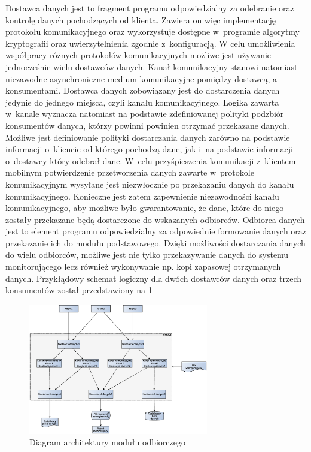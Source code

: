 Dostawca danych jest to fragment programu odpowiedzialny za odebranie
oraz kontrolę danych pochodzących od klienta. Zawiera on więc
implementację protokołu komunikacyjnego oraz wykorzystuje dostępne
w~programie algorytmy kryptografii oraz uwierzytelnienia zgodnie
z~konfiguracją. W celu umożliwienia współpracy różnych protokołów
komunikacyjnych możliwe jest używanie jednocześnie wielu dostawców
danych. Kanał komunikacyjny stanowi natomiast niezawodne
asynchroniczne medium komunikacyjne pomiędzy dostawcą, a
konsumentami. Dostawca danych zobowiązany jest do dostarczenia danych
jedynie do jednego miejsca, czyli kanału komunikacyjnego. Logika
zawarta w~kanale wyznacza natomiast na podstawie zdefiniowanej
polityki podzbiór konsumentów danych, którzy powinni powinien otrzymać
przekazane danych. Możliwe jest definiowanie polityki dostarczania
danych zarówno na podstawie informacji o~kliencie od którego pochodzą
dane, jak i~na podstawie informacji o~dostawcy który odebrał
dane. W~celu przyśpieszenia komunikacji z~klientem mobilnym
potwierdzenie przetworzenia danych zawarte w~protokole komunikacyjnym
wysyłane jest niezwłocznie po przekazaniu danych do kanału
komunikacyjnego. Konieczne jest zatem zapewnienie niezawodności kanału
komunikacyjnego, aby możliwe było gwarantowanie, że dane, które do
niego zostały przekazane będą dostarczone do wskazanych
odbiorców. Odbiorca danych jest to element programu odpowiedzialny za
odpowiednie formowanie danych oraz przekazanie ich do modułu
podstawowego. Dzięki możliwości dostarczania danych do wielu
odbiorców, możliwe jest nie tylko przekazywanie danych do systemu
monitorującego lecz również wykonywanie np. kopi zapasowej otrzymanych
danych. Przykłądowy schemat logiczny dla dwóch dostawców danych oraz
trzech konsumentów został przedstawiony na \ref{fig:odbiorczy}

\begin{figure}[ht]
  \caption{Diagram architektury modułu odbiorczego}
  \label{fig:odbiorczy}
  \centering
\includegraphics[width=0.7\textwidth]{img/odbiorczy}
\end{figure}

